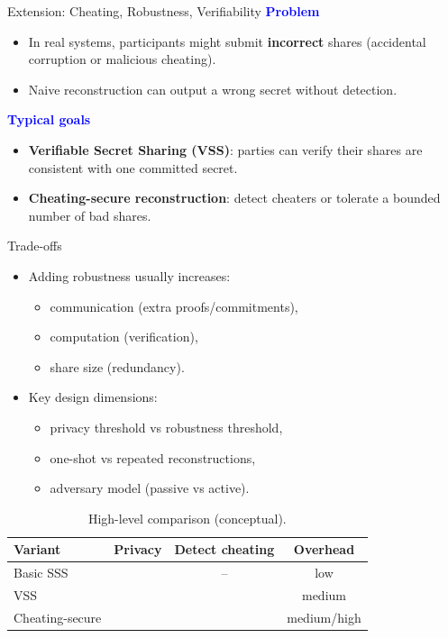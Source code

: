 \begin{frame}{Extension: Cheating, Robustness, Verifiability \cite{ogata2006optimum}}
	\textbf{\textcolor{blue}{Problem}}
	\begin{itemize}
		\item In real systems, participants might submit \textbf{incorrect} shares (accidental corruption or malicious cheating).
		\item Naive reconstruction can output a wrong secret without detection.
	\end{itemize}

	\textbf{\textcolor{blue}{Typical goals}}
	\begin{itemize}
		\item \textbf{Verifiable Secret Sharing (VSS)}: parties can verify their shares are consistent with one committed secret.
		\item \textbf{Cheating-secure reconstruction}: detect cheaters or tolerate a bounded number of bad shares.
	\end{itemize}

\end{frame}

\begin{frame}{Trade-offs}
	\begin{itemize}
		\item Adding robustness usually increases:
			\begin{itemize}
				\item communication (extra proofs/commitments),
				\item computation (verification),
				\item share size (redundancy).
			\end{itemize}
		\item Key design dimensions:
			\begin{itemize}
				\item privacy threshold vs robustness threshold,
				\item one-shot vs repeated reconstructions,
				\item adversary model (passive vs active).
			\end{itemize}
	\end{itemize}

	\begin{table}
		\centering
		\begin{tabular}{lccc}
			\toprule
			\textbf{Variant} & \textbf{Privacy} & \textbf{Detect cheating} & \textbf{Overhead} \\
			\midrule
			Basic SSS & \checkmark & -- & low \\
			VSS & \checkmark & \checkmark & medium \\
			Cheating-secure & \checkmark & \checkmark & medium/high \\
			\bottomrule
		\end{tabular}
		\caption{High-level comparison (conceptual).}
	\end{table}
\end{frame}
